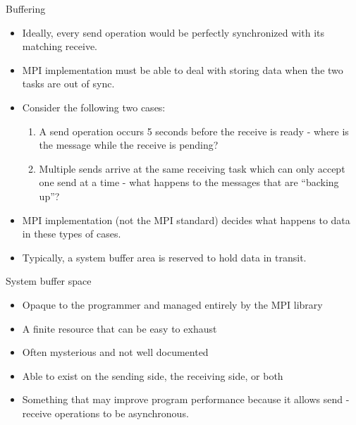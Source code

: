 \documentclass[10pt,t]{beamer}
\begin{document}
\begin{frame}[allowframebreaks]{Buffering}
  \begin{itemize}
    \item Ideally, every send operation would be perfectly synchronized with its matching receive.
    \item MPI implementation must be able to deal with storing data when the two tasks are out of sync.
    \item Consider the following two cases:
      \begin{enumerate}
        \item A send operation occurs 5 seconds before the receive is ready - where is the message while the receive is pending?
        \item Multiple sends arrive at the same receiving task which can only accept one send at a time - what happens to the messages that are “backing up”?
      \end{enumerate}
    \item MPI implementation (not the MPI standard) decides what happens to data in these types of cases. 
    \item Typically, a system buffer area is reserved to hold data in transit.
  \end{itemize}
  \begin{block}{System buffer space}
    \begin{itemize}
      \item Opaque to the programmer and managed entirely by the MPI library
      \item A finite resource that can be easy to exhaust
      \item Often mysterious and not well documented
      \item Able to exist on the sending side, the receiving side, or both
      \item Something that may improve program performance because it allows send - receive operations to be asynchronous.
    \end{itemize}
  \end{block}
\end{frame}
\end{document}
